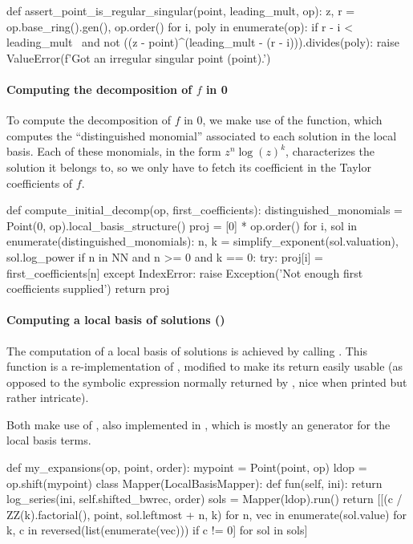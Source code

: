 \documentclass[../main.tex]{subfiles}
\begin{document}
\begin{pyblock}[fontsize=\tiny]
def assert_point_is_regular_singular(point, leading_mult, op):
	z, r = op.base_ring().gen(), op.order()
	for i, poly in enumerate(op):
		if r - i < leading_mult \
		       and not ((z - point)^(leading_mult - (r - i))).divides(poly):
			raise ValueError(f'Got an irregular singular point ({point}).')
\end{pyblock}

\paragraph{Computing the decomposition of $f$ in 0}
To compute the decomposition of $f$ in 0, we make use of the  function, which computes the ``distinguished monomial'' associated to each solution in the local basis. Each of these monomials, in the form $z^n \log(z)^k$, characterizes the solution it belongs to, so we only have to fetch its coefficient in the Taylor coefficients of $f$.

\begin{pyblock}
def compute_initial_decomp(op, first_coefficients):
	distinguished_monomials = Point(0, op).local_basis_structure()
	proj = [0] * op.order()
	for i, sol in enumerate(distinguished_monomials):
		n, k = simplify_exponent(sol.valuation), sol.log_power
		if n in NN and n >= 0 and k == 0:
			try:
				proj[i] = first_coefficients[n]
			except IndexError:
				raise Exception('Not enough first coefficients supplied')
	return proj
\end{pyblock}

\paragraph{Computing a local basis of solutions ()}
The computation of a local basis of solutions is achieved by calling . This function is a re-implementation of , modified to make its return easily usable (as opposed to the symbolic expression normally returned by , nice when printed but rather intricate).

Both make use of , also implemented in , which is mostly an generator for the local basis terms.

\begin{pyblock}[fontsize=\tiny]
def my_expansions(op, point, order):
	mypoint = Point(point, op)
	ldop = op.shift(mypoint)
	class Mapper(LocalBasisMapper):
		def fun(self, ini):
			return log_series(ini, self.shifted_bwrec, order)
	sols = Mapper(ldop).run()
	return [[(c / ZZ(k).factorial(),
					point,
					sol.leftmost + n,
					k)
				for n, vec in enumerate(sol.value)
				for k, c in reversed(list(enumerate(vec)))
				if c != 0]
			for sol in sols]
\end{pyblock}
\end{document}
